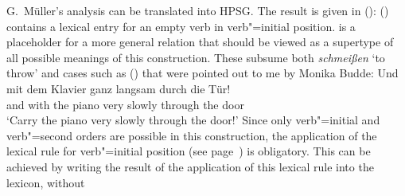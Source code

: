 \begin{exe}
\begin{xlist}[iv.]
\begin{exe}
\begin{xlist}[iv.]
G.\ Müller's analysis can be translated into HPSG. The result is given in ():
\ea
{}
\z
() contains a lexical entry for an empty verb in verb"=initial position. 
is a placeholder for a more general relation that should be viewed as a supertype of all possible meanings of this
construction. These subsume both \emph{schmeißen} `to throw' and cases such as () that were pointed out to me by Monika Budde:
\ea
\label{Klavier-durch-die-Tuer}
\gll Und mit dem Klavier ganz langsam durch die Tür!\\
	 and with the piano very slowly through the door\\
\glt `Carry the piano very slowly through the door!'
\z
Since only verb"=initial and verb"=second orders are possible in this construction, the application of the lexical rule for verb"=initial position
(see page~\pageref{lr-verb-movement}) is obligatory. This can be achieved by writing the result of the application of this lexical rule into the lexicon, without

\end{xlist}
\end{exe}
\end{xlist}
\end{exe}
